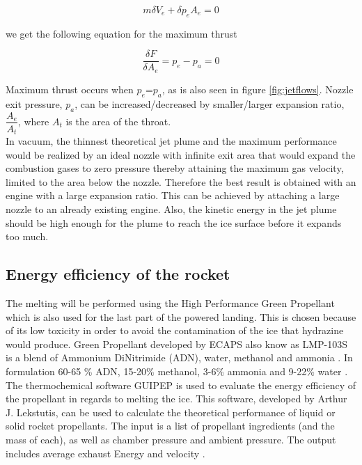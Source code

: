 \begin{equation}
m\delta V_e+\delta p_e A_e=0
\end{equation}

we get the following equation for the maximum thrust

\begin{equation}
\dfrac{\delta F}{\delta A_e}=p_e-p_a=0 
\end{equation}

Maximum thrust occurs when $p_e$=$p_a$, as is also seen in figure \ref{fig:jetflows}. Nozzle exit pressure, $p_a$, can be increased/decreased by smaller/larger expansion ratio, $\dfrac{A_e}{A_t}$, where $A_t$ is the area of the throat. \\
In vacuum, the thinnest theoretical jet plume and the maximum performance would be realized by an ideal nozzle with infinite exit area that would expand the combustion gases to zero pressure thereby attaining the maximum gas velocity, limited to the area below the nozzle. Therefore the best result is obtained with an engine with a large expansion ratio. This can be achieved by attaching a large nozzle to an already existing engine. Also, the kinetic energy in the jet plume should be high enough for the plume to reach the ice surface before it expands too much. 

\subsection{Energy efficiency of the rocket}
The melting will be performed using the High Performance Green Propellant which is also used for the last part of the powered landing. This is chosen because of its low toxicity in order to avoid the contamination of the ice that hydrazine would produce. Green Propellant developed by ECAPS also know as LMP-103S is a blend of Ammonium DiNitrimide (ADN), water, methanol and ammonia \cite{Walter_2014}. In formulation 60-65 \% ADN, 15-20\% methanol, 3-6\% ammonia and 9-22\% water \cite{Taylor_2013}.\\

The thermochemical software GUIPEP is used to evaluate the energy efficiency of the propellant in regards to melting the ice. This software, developed by Arthur J. Lekstutis, can be used to calculate the theoretical performance of liquid or solid rocket propellants. The input is a list of propellant ingredients (and the mass of each), as well as chamber pressure and ambient pressure. The output includes average exhaust Energy and velocity \cite{GUIPEP}. \\

